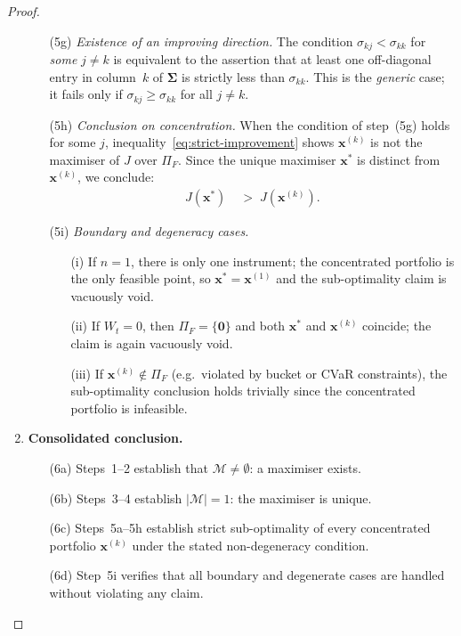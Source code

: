 \documentclass[12pt,openany]{book}
\newcommand{\bfx}{\mathbf{x}}
\numberwithin{equation}{chapter}
\theoremstyle{plain}
\theoremstyle{definition}
\theoremstyle{remark}
\numberwithin{equation}{chapter}
\theoremstyle{plain}
\newcommand{\bfSigma}{\boldsymbol{\Sigma}}
\begin{document}
\begin{proof}
\begin{enumerate}
\begin{enumerate}
  \item[\textup{(5g)}] \textit{Existence of an improving direction.}
        The condition $\sigma_{kj} < \sigma_{kk}$ for \emph{some}
        $j \neq k$ is equivalent to the assertion that at least one
        off-diagonal entry in column~$k$ of $\bfSigma$ is strictly
        less than $\sigma_{kk}$.  This is the \emph{generic} case;
        it fails only if $\sigma_{kj} \geq \sigma_{kk}$ for all
        $j \neq k$.

  \item[\textup{(5h)}] \textit{Conclusion on concentration.}
        When the condition of step~(5g) holds for some $j$,
        inequality~\eqref{eq:strict-improvement} shows
        $\bfx^{(k)}$ is not the maximiser of $J$ over $\Pi_F$.
        Since the unique maximiser $\bfx^*$ is distinct from
        $\bfx^{(k)}$, we conclude:
        \begin{align}
          J(\bfx^*) &\;>\; J(\bfx^{(k)}).
          \label{eq:suboptimality}
        \end{align}

  \item[\textup{(5i)}] \textit{Boundary and degeneracy cases.}
        \begin{enumerate}
          \item[\textup{(i)}] If $n = 1$, there is only one
                instrument; the concentrated portfolio is the only
                feasible point, so $\bfx^* = \bfx^{(1)}$ and the
                sub-optimality claim is vacuously void.
          \item[\textup{(ii)}] If $W_t = 0$, then $\Pi_F =
                \{\mathbf{0}\}$ and both $\bfx^*$ and $\bfx^{(k)}$
                coincide; the claim is again vacuously void.
          \item[\textup{(iii)}] If $\bfx^{(k)} \notin \Pi_F$
                (e.g.\ violated by bucket or CVaR constraints),
                the sub-optimality conclusion holds trivially
                since the concentrated portfolio is infeasible.
        \end{enumerate}
\end{enumerate}

\item \textbf{Consolidated conclusion.}

\begin{enumerate}
  \item[\textup{(6a)}] Steps~1--2 establish that $\mathcal{M}
        \neq \emptyset$: a maximiser exists.
  \item[\textup{(6b)}] Steps~3--4 establish $|\mathcal{M}| = 1$:
        the maximiser is unique.
  \item[\textup{(6c)}] Steps~5a--5h establish strict
        sub-optimality of every concentrated portfolio
        $\bfx^{(k)}$ under the stated non-degeneracy condition.
  \item[\textup{(6d)}] Step~5i verifies that all boundary and
        degenerate cases are handled without violating any claim.
\end{enumerate}


\end{enumerate}
\end{proof}
\end{document}
